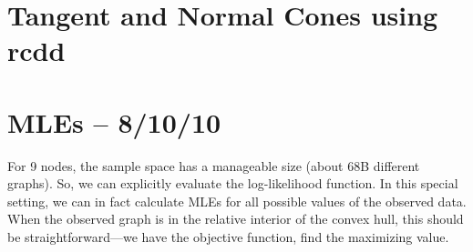 \documentclass{amsbook}
\theoremstyle{definition}
\theoremstyle{remark}
\begin{document}
\section{Tangent and Normal Cones using rcdd}

\section{MLEs -- 8/10/10}
For 9 nodes, the sample space has a manageable size (about 68B different graphs).  So, we can explicitly evaluate the log-likelihood function.  In this special setting, we can in fact calculate MLEs for all possible values of the observed data.
When the observed graph is in the relative interior of the convex hull, this should be straightforward---we have the objective function, find the maximizing value.
\end{document}
